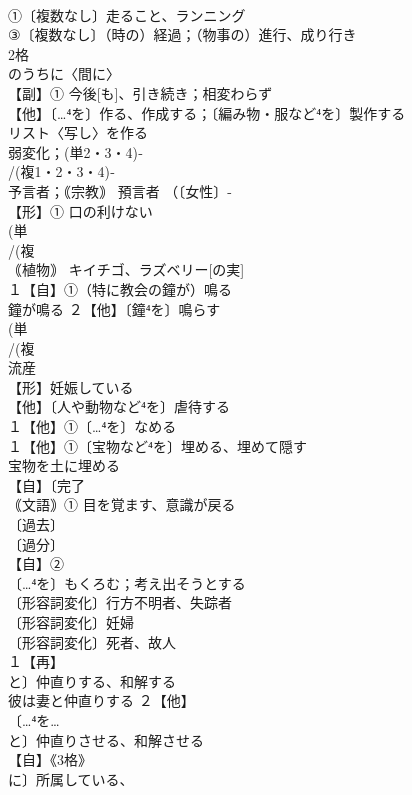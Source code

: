 \documentclass[8pt]{extreport}
\begin{document}
\begin{CJK}{UTF8}{min}
\\	①〔複数なし〕走ること、ランニング 
\\	③〔複数なし〕（時の）経過；（物事の）進行、成り行き 
\\	2格	
\\	のうちに〈間に〉
\\	【副】① 今後[も]、引き続き；相変わらず
\\	【他】〔…⁴を〕作る、作成する；〔編み物・服など⁴を〕製作する 
\\	リスト〈写し〉を作る 
\\	弱変化；(単2・3・4)‐
\\	/(複1・2・3・4)‐
\\	予言者；｟宗教｠ 預言者 （〔女性〕-
\\	【形】① 口の利けない 
\\	(単
\\	/(複
\\	｟植物｠ キイチゴ、ラズベリー[の実] 
\\	１【自】①（特に教会の鐘が）鳴る 
\\	鐘が鳴る ２【他】〔鐘⁴を〕鳴らす
\\	(単
\\	/(複
\\	流産 
\\	【形】妊娠している 
\\	【他】〔人や動物など⁴を〕虐待する
\\	１【他】①〔…⁴を〕なめる 
\\	１【他】①〔宝物など⁴を〕埋める、埋めて隠す 
\\	宝物を土に埋める
\\	【自】〔完了
\\	｟文語｠① 目を覚ます、意識が戻る 
\\	〔過去〕
\\	〔過分〕
\\	【自】②
\\	〔…⁴を〕もくろむ；考え出そうとする
\\	〔形容詞変化〕行方不明者、失踪者 
\\	〔形容詞変化〕妊婦 
\\	〔形容詞変化〕死者、故人 
\\	１【再】
\\	と〕仲直りする、和解する 
\\	彼は妻と仲直りする ２【他】
\\	〔…⁴を…
\\	と〕仲直りさせる、和解させる
\\	【自】《3格》
\\	に〕所属している、

\end{CJK}
\end{document}
